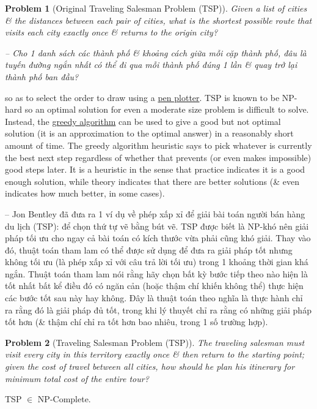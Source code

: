 \documentclass{article}
\newtheorem{problem}{Problem}
\begin{document}
\begin{problem}[Original Traveling Salesman Problem (TSP)]
	Given a list of cities \& the distances between each pair of cities, what is the shortest possible route that visits each city exactly once \& returns to the origin city?
	
	-- Cho 1 danh sách các thành phố \& khoảng cách giữa mỗi cặp thành phố, đâu là tuyến đường ngắn nhất có thể đi qua mỗi thành phố đúng 1 lần \& quay trở lại thành phố ban đầu?
\end{problem}
so as to select the order to draw using a \href{https://en.wikipedia.org/wiki/Pen_plotter}{pen plotter}. TSP is known to be NP-hard so an optimal solution for even a moderate size problem is difficult to solve. Instead, the \href{https://en.wikipedia.org/wiki/Greedy_algorithm}{greedy algorithm} can be used to give a good but not optimal solution (it is an approximation to the optimal answer) in a reasonably short amount of time. The greedy algorithm heuristic says to pick whatever is currently the best next step regardless of whether that prevents (or even makes impossible) good steps later. It is a heuristic in the sense that practice indicates it is a good enough solution, while theory indicates that there are better solutions (\& even indicates how much better, in some cases).

-- {\sc Jon Bentley} đã đưa ra 1 ví dụ về phép xấp xỉ để giải bài toán người bán hàng du lịch (TSP): để chọn thứ tự vẽ bằng bút vẽ. TSP được biết là NP-khó nên giải pháp tối ưu cho ngay cả bài toán có kích thước vừa phải cũng khó giải. Thay vào đó, thuật toán tham lam có thể được sử dụng để đưa ra giải pháp tốt nhưng không tối ưu (là phép xấp xỉ với câu trả lời tối ưu) trong 1 khoảng thời gian khá ngắn. Thuật toán tham lam nói rằng hãy chọn bất kỳ bước tiếp theo nào hiện là tốt nhất bất kể điều đó có ngăn cản (hoặc thậm chí khiến không thể) thực hiện các bước tốt sau này hay không. Đây là thuật toán theo nghĩa là thực hành chỉ ra rằng đó là giải pháp đủ tốt, trong khi lý thuyết chỉ ra rằng có những giải pháp tốt hơn (\& thậm chí chỉ ra tốt hơn bao nhiêu, trong 1 số trường hợp).

\begin{problem}[Traveling Salesman Problem (TSP)]
	The traveling salesman must visit every city in this territory exactly once \& then return to the starting point; given the cost of travel between all cities, how should he plan his itinerary for minimum total cost of the entire tour?
\end{problem}
TSP $\in$ NP-Complete.
\end{document}
